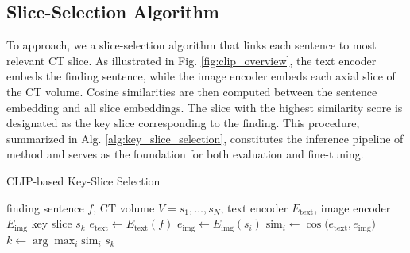 \documentclass[bioengineering,article,submit,pdftex,moreauthors]{Definitions/mdpi}
\begin{document}
\subsection{Slice-Selection Algorithm}  

  To   approach, we  a slice-selection algorithm that links each  sentence to  most relevant CT slice. 
  As illustrated in Fig. \ref{fig:clip_overview}, the text encoder embeds the finding sentence, while the image encoder embeds each axial slice of the CT volume. 
  Cosine similarities are then computed between the sentence embedding and all slice embeddings. 
  The slice with the highest similarity score is designated as the key slice corresponding to the finding. 
  This procedure, summarized in Alg. \ref{alg:key_slice_selection}, constitutes the inference pipeline of  method and serves as the foundation for both evaluation and fine-tuning.



\begin{algorithm}
  \caption{CLIP-based Key-Slice Selection}
  \label{alg:key_slice_selection}
  \begin{algorithmic}[1]
    \REQUIRE finding sentence $f$, CT volume $V = {s_1, \dots, s_N}$, text encoder $E_{\mathrm{text}}$, image encoder $E_{\mathrm{img}}$
    \ENSURE key slice $s_k$
    \STATE $e_{\mathrm{text}} \leftarrow E_{\mathrm{text}}(f)$ 
      \STATE $e_{\mathrm{img}} \leftarrow E_{\mathrm{img}}(s_i)$ 
      \STATE $\mathrm{sim}_i \leftarrow \cos\bigl(e_{\mathrm{text}}, e_{\mathrm{img}}\bigr)$ 
    \ENDFOR
    \STATE $k \leftarrow \arg\max_i \mathrm{sim}_i$ 
    \RETURN $s_k$
  \end{algorithmic}
\end{algorithm}


\end{document}
